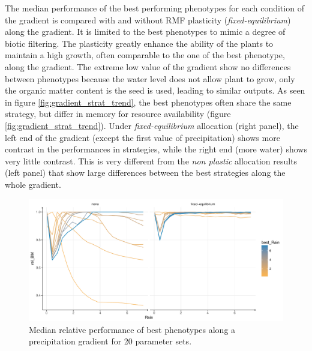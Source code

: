 The median performance of the best performing phenotypes for each condition of the gradient is compared with and without RMF plasticity (\textit{fixed-equilibrium}) along the gradient. It is limited to the best phenotypes to mimic a degree of biotic filtering. The plasticity greatly enhance the ability of the plants to maintain a high growth, often comparable to the one of the best phenotype, along the gradient. The extreme low value of the gradient show no differences between phenotypes because the water level does not allow plant to grow, only the organic matter content is the seed is used, leading to similar outputs. As seen in figure \ref{fig:gradient_strat_trend}, the best phenotypes often share the same strategy, but differ in memory for resource availability (figure \ref{fig:gradient_strat_trend}). Under \textit{fixed-equilibrium} allocation (right panel), the left end of the gradient (except the first value of precipitation) shows more contrast in the performances in strategies, while the right end (more water) shows very little contrast. This is very different from the \textit{non plastic} allocation results (left panel) that show large differences between the best strategies along the whole gradient.  

\begin{figure}\label{fig:gradient_ranking}
\includegraphics[width = \textwidth]{./2_PP/Figures/Rain/optimum_shifting_median.pdf}
\caption{Median relative performance of best phenotypes along a precipitation gradient for 20 parameter sets.}
\end{figure}

%
%




